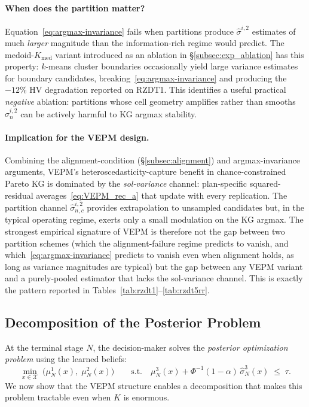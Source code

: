 \documentclass[12pt]{article}
\theoremstyle{plain}
\theoremstyle{definition}
\theoremstyle{remark}
\begin{document}
\paragraph{When does the partition matter?}
Equation~\eqref{eq:argmax-invariance} fails when partitions produce
$\hat\sigma^{i,2}$ estimates of much \emph{larger} magnitude than the
information-rich regime would predict.  The medoid-$K_{\mathrm{med}}$ variant
introduced as an ablation in \S\ref{subsec:exp_ablation} has this
property: $k$-means cluster
boundaries occasionally yield large variance estimates for boundary
candidates, breaking~\eqref{eq:argmax-invariance} and producing the
$-12\%$ HV degradation reported on RZDT1.  This identifies a useful
practical \emph{negative} ablation: partitions whose cell geometry
amplifies rather than smooths $\hat\sigma^{i,2}_n$ can be actively
harmful to KG argmax stability.

\paragraph{Implication for the VEPM design.}
Combining the alignment-condition (\S\ref{subsec:alignment}) and
argmax-invariance arguments, VEPM's heteroscedasticity-capture benefit
in chance-constrained Pareto KG is dominated by the \emph{sol-variance}
channel: plan-specific squared-residual averages~\eqref{eq:VEPM_rec_a}
that update with every replication.  The partition channel
$\hat\sigma^{i,2}_{n,c}$ provides extrapolation to unsampled candidates
but, in the typical operating regime, exerts only a small modulation on
the KG argmax.  The strongest empirical signature of VEPM is therefore
not the gap between two partition schemes (which the alignment-failure
regime predicts to vanish, and which~\eqref{eq:argmax-invariance}
predicts to vanish even when alignment holds, as long as variance
magnitudes are typical) but the gap between any VEPM variant and a
purely-pooled estimator that lacks the sol-variance channel.  This is
exactly the pattern reported in
Tables~\ref{tab:rzdt1}--\ref{tab:rzdt5rr}.


\subsection{Decomposition of the Posterior Problem}\label{subsec:decomposition}

At the terminal stage $N$, the decision-maker solves the \emph{posterior optimization problem} using the learned beliefs:
\begin{equation}\label{eq:posterior_problem}
  \min_{x \in \mathcal{X}}\; \bigl(\mu^1_N(x),\; \mu^2_N(x)\bigr) \qquad \text{s.t.} \quad \mu^3_N(x) + \Phi^{-1}(1-\alpha)\, \hat{\sigma}^3_N(x) \;\leq\; \tau.
\end{equation}
We now show that the VEPM structure enables a decomposition that makes this problem tractable even when $K$ is enormous.
\end{document}
